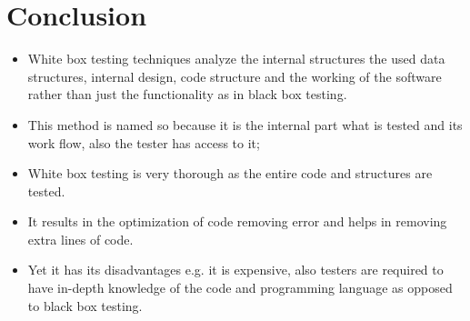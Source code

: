 \section{Conclusion}

\begin{itemize}
	\item White box testing techniques analyze the internal structures the used data structures, internal design, code structure and the working of the software rather than just the functionality as in black box testing. 
	\item This method is named so because it is the internal part what is tested and its work flow, also the tester has access to it;
	\item White box testing is very thorough as the entire code and structures are tested.
	\item It results in the optimization of code removing error and helps in removing extra lines of code.
	\item Yet it has its disadvantages e.g. it is expensive, also testers are required to have in-depth knowledge of the code and programming language as opposed to black box testing.
\end{itemize}

\clearpage